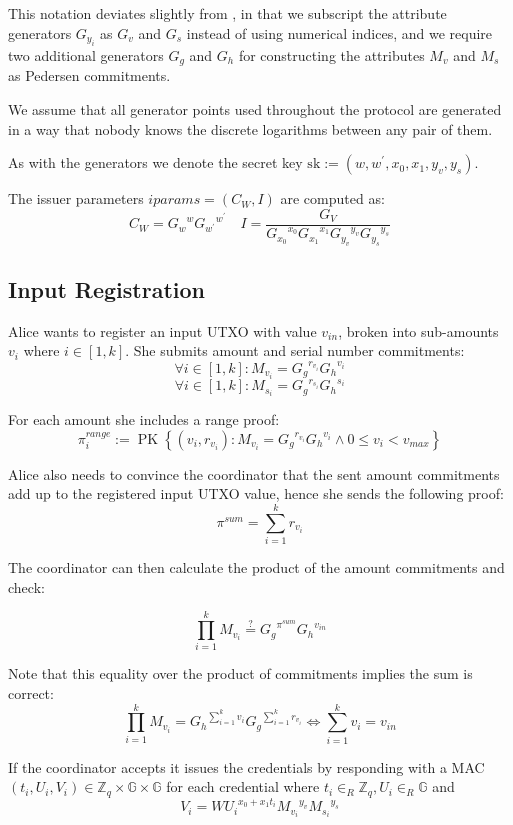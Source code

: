 \documentclass{article}
\begin{document}
This notation deviates slightly from \cite{chase2019signal}, in that we subscript the attribute generators $G_{y_i}$ as $G_v$ and $G_s$ instead of using numerical indices, and we require two additional generators $G_g$ and $G_h$ for constructing the attributes $M_v$ and $M_s$ as Pedersen commitments.

We assume that all generator points used throughout the protocol are generated in a way that nobody knows the discrete logarithms between any pair of them.

As with the generators we denote the secret key
\( \mathrm{sk} := \left(w, w^{\prime}, x_{0}, x_{1},y_{v}, y_{s}\right) \).

The issuer parameters
$\mathit{iparams} =  (C_{W}, I)$
are computed as:
\[
C_{W}={G_w}^{w} {G_{w^\prime}}^{w^\prime}
\quad
I=\frac{G_{V}}{{G_{x_0}}^{x_0} {G_{x_1}}^{x_1} {G_{y_v}}^{y_v} {G_{y_s}}^{y_s}}
\]


\subsection{Input Registration}

Alice wants to register an input UTXO with value $v_{\mathit{in}}$, broken into sub-amounts $v_i$ where $i \in \left[1,k\right]$.
She submits amount and serial number commitments:
\[ \forall i \in \left[1,k\right]: M_{v_i}={G_g}^{r_{v_i}}{G_h}^{v_i} \]
\[ \forall i \in \left[1,k\right]: M_{s_i}={G_g}^{r_{s_i}}{G_h}^{s_i} \]

For each amount she includes a range proof:
\[
\pi^{\mathit{range}}_i := \operatorname{PK}\left\{\left(v_i, r_{v_i} \right) :
M_{v_i} = {G_g}^{r_{v_i}}{G_h}^{v_i}
\land
0 \leq v_i < v_{\mathit{max}} \right\}
\]

Alice also needs to convince the coordinator that the sent amount commitments add up to the registered input UTXO value, hence she sends the following proof:
\[ \pi^{\mathit{sum}}=\sum_{i=1}^{k} r_{v_i} \]

The coordinator can then calculate the product of the amount commitments and check:

\[ \prod_{i=1}^{k} M_{v_i}
\stackrel{?}{=}
{G_g}^{\pi^{\mathit{sum}}}{G_h}^{v_{\mathit{in}}}
\]

Note that this equality over the product of commitments implies the sum is correct:
\[\prod_{i=1}^{k} M_{v_i}
= {G_h}^{\sum_{i=1}^{k} v_i} {G_g}^{\sum_{i=1}^{k} r_{v_i}}
\iff
\sum_{i=1}^{k} v_i = v_{\mathit{in}}
\]

If the coordinator accepts it issues the credentials by responding with a MAC
$(t_i, U_i, V_i) \in \mathbb{Z}_q \times \mathbb{G} \times \mathbb{G}$ for each credential
where
$t_i \in_{R} \mathbb{Z}_{q}, U_i \in_{R} \mathbb{G}$
and
\[
V_i=W {U_i}^{x_{0}+x_{1} t_i}{M_{v_i}}^{y_v} {M_{s_i}}^{y_s}
\]
\end{document}
